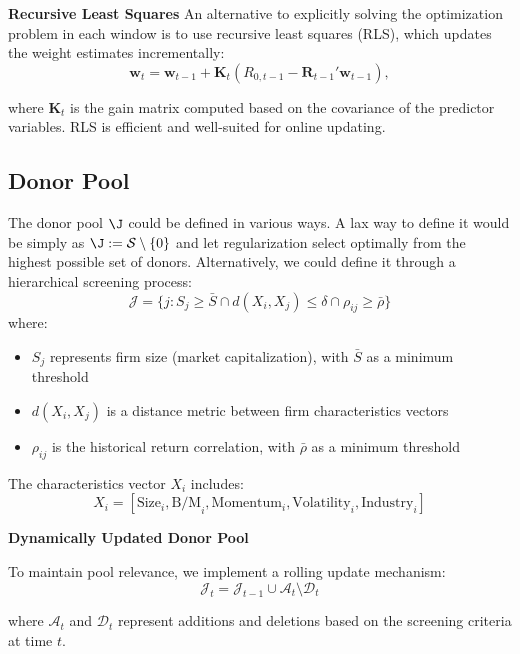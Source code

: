 \textbf{Recursive Least Squares}
An alternative to explicitly solving the optimization problem in each window is to use recursive least squares (RLS), which updates the weight estimates incrementally:
\begin{equation*}
\mathbf{w}_t = \mathbf{w}_{t-1} + \mathbf{K}_t \left( R_{0, t-1} - \mathbf{R}_{t-1}' \mathbf{w}_{t-1} \right),
\end{equation*}

where $\mathbf{K}_t$ is the gain matrix computed based on the covariance of the predictor variables. RLS is efficient and well-suited for online updating.




\subsection{Donor Pool}
The donor pool $\J$ could be defined in various ways. A lax way to define it would be simply as $\J := \mathcal S \setminus \{0\}$ and let regularization select optimally from the highest possible set of donors. Alternatively, we could define it through a hierarchical screening process:
\begin{equation*}
    \mathcal{J} = \{j: S_j \geq \bar{S} \cap d(X_i, X_j) \leq \delta \cap \rho_{ij} \geq \bar{\rho}\}
\end{equation*}
where:
\begin{itemize}
    \item $S_j$ represents firm size (market capitalization), with $\bar{S}$ as a minimum threshold
    \item $d(X_i, X_j)$ is a distance metric between firm characteristics vectors
    \item $\rho_{ij}$ is the historical return correlation, with $\bar{\rho}$ as a minimum threshold
\end{itemize}

The characteristics vector $X_i$ includes:
\begin{equation*}
    X_i = [\text{Size}_i, \text{B/M}_i, \text{Momentum}_i, \text{Volatility}_i, \text{Industry}_i]
\end{equation*}

\textbf{Dynamically Updated Donor Pool}

To maintain pool relevance, we implement a rolling update mechanism:
\begin{equation*}
    \mathcal{J}_t = \mathcal{J}_{t-1} \cup \mathcal{A}_t \setminus \mathcal{D}_t
\end{equation*}

where $\mathcal{A}_t$ and $\mathcal{D}_t$ represent additions and deletions based on the screening criteria at time $t$.


